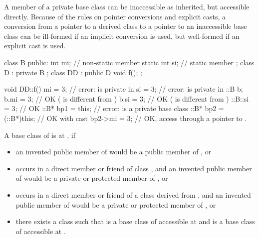 \pnum
\begin{note}
A member of a private base class can be inaccessible as inherited,
but accessible directly.
Because of the rules on pointer conversions and
explicit casts,
a conversion from a pointer to a derived class to a pointer
to an inaccessible base class can be ill-formed if an implicit conversion
is used, but well-formed if an explicit cast is used.
\begin{example}
\begin{codeblock}
class B {
public:
  int mi;                       // non-static member
  static int si;                // static member
};
class D : private B {
};
class DD : public D {
  void f();
};

void DD::f() {
  mi = 3;                       // error:  is private in 
  si = 3;                       // error:  is private in 
  ::B  b;
  b.mi = 3;                     // OK ( is different from )
  b.si = 3;                     // OK ( is different from )
  ::B::si = 3;                  // OK
  ::B* bp1 = this;              // error:  is a private base class
  ::B* bp2 = (::B*)this;        // OK with cast
  bp2->mi = 3;                  // OK, access through a pointer to .
}
\end{codeblock}
\end{example}
\end{note}

\pnum
A base class
of
is
at
,
if
\begin{itemize}
\item
an invented public member of
would be a public member of
, or
\item
{}
occurs in a direct member or friend of class
,
and an invented public member of
would be a private or protected member of
, or
\item
{}
occurs in a direct member or friend of a class
derived from
,
and an invented public member of
would be a private or protected member of
, or
\item
there exists a class
such that
is a base class of
accessible at
and
is a base class of
accessible at
.
\end{itemize}

